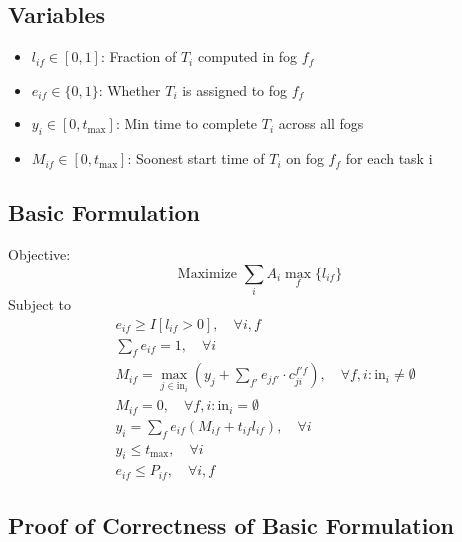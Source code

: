 \subsection{Variables}
\begin{itemize}
    \item $l_{if} \in [0,1]$: Fraction of $T_{i}$ computed in fog $f_f$
    \item $e_{if} \in \{0,1\}$: Whether $T_{i}$ is assigned to fog $f_f$
    \item $y_{i} \in [0,t_{\max}]$: Min time to complete $T_i$ across all fogs
    \item $M_{if} \in [0,t_{\max}]$: Soonest start time of $T_i$ on fog $f_f$ for each task i 
\end{itemize}

\subsection{Basic Formulation}
\label{sec:basic}

Objective:
\begin{equation}
\label{eq:objective}
    \text{Maximize } \sum_i A_i \max_f \{ l_{if} \}
\end{equation}
Subject to
\begin{align}
    &e_{if} \geq I[l_{if}>0], \quad \forall i, f \label{eq:lvse} \\ 
    &\sum_f e_{if} = 1, \quad \forall i \label{eq:onefog} \\
    &M_{if} = \max_{j \in \text{in}_i} \left( y_j + \sum_{f'} e_{jf'}  \cdot c_{ji}^{f'f} \right), \quad \forall f, i: \text{in}_i \neq \emptyset
    \label{eq:resMif-noempty}\\
    &M_{if} = 0, \quad \forall f, i: \text{in}_i = \emptyset
    \label{eq:resMif} \\
    &y_i = \sum_f e_{if} \left( M_{if} + t_{if} l_{if} \right) , \quad \forall i  \label{eq-36}\\
    &y_i \leq t_{\max}, \quad \forall i \label{eq:yitmax} \\
    &e_{if} \leq P_{if}, \quad \forall i,f \label{eq:permitted}
\end{align}

\subsection{Proof of Correctness of Basic Formulation}

